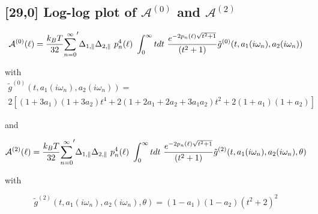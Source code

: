 \documentclass[a4paper]{article}
\begin{document}
\begin{center}
\subsection{[29,0] Log-log plot of $\mathcal{A}^{(0)}$ and $\mathcal{A}^{(2)}$ }
\begin{equation}
{\cal A}^{(0)}(\ell) = \frac{k_BT}{32}  {\sum_{n=0}^{\infty}}' \Delta_{1,\parallel} \Delta_{2,\parallel} ~p_n^{4}(\ell) ~\int_0^{\infty} t dt ~\frac{e^{- 2 p_n(\ell) \sqrt{t^{2} + 1}}}{(t^{2} + 1)} \tilde g^{(0)}(t, a_1(i \omega_n), a_2(i \omega_n))
\end{equation}

with
\begin{multline*}
\tilde g^{(0)}(t, a_1(i \omega_n), a_2(i \omega_n)) = \\ 
2 \left[ (1+3a_1)(1+3a_2) t^{4} + 2 (1+2a_1+2a_2+3a_1a_2) t^{2}  + 2(1+a_1)(1+a_2)\right]
\end{multline*}


%
and

\begin{equation}
{\cal A}^{(2)}(\ell) = \frac{k_BT}{32}  {\sum_{n=0}^{\infty}}' \Delta_{1,\parallel} \Delta_{2,\parallel} ~p_n^{4}(\ell) ~\int_0^{\infty} t dt ~\frac{e^{- 2 p_n(\ell) \sqrt{t^{2} + 1}}}{(t^{2} + 1)} \tilde g^{(2)}(t, a_1(i \omega_n), a_2(i \omega_n), \theta)
\end{equation}

with

\begin{equation}
\tilde g^{(2)}(t, a_1(i \omega_n), a_2(i \omega_n), \theta) = (1-a_1)(1-a_2)(t^{2} + 2)^2
\label{befgqw}
\end{equation}


\end{center}
\end{document}
